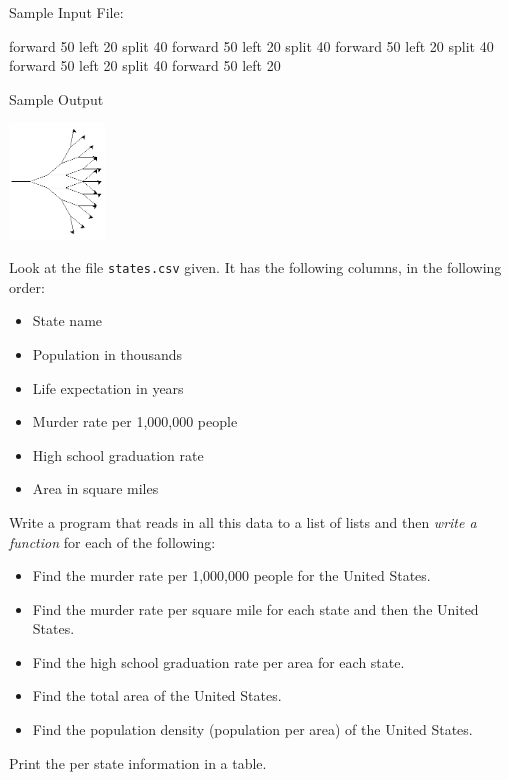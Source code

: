 \documentclass[11pt]{cselabheader}
\begin{document}
\begin{ex}[navigate3.py]
    Sample Input File:
    \begin{python3code}
forward 50
left 20
split 40
forward 50
left 20
split 40
forward 50
left 20
split 40
forward 50
left 20
split 40
forward 50
left 20
    \end{python3code}

    Sample Output
    \begin{center}
      \includegraphics[width=1.0in]{img/nav3_example}
    \end{center}
  \end{ex}

  \begin{ex}[states.py]
    Look at the file \texttt{states.csv} given. It has the following columns, in
    the following order:
    \begin{itemize}
      \item State name
      \item Population in thousands
      \item Life expectation in years
      \item Murder rate per 1,000,000 people
      \item High school graduation rate
      \item Area in square miles
    \end{itemize}

    Write a program that reads in all this data to a list of lists and then
    \emph{write a function} for each of the following:
    \begin{itemize}
      \item Find the murder rate per 1,000,000 people for the United States.
      \item Find the murder rate per square mile for each state and then the
        United States.
      \item Find the high school graduation rate per area for each state.
      \item Find the total area of the United States.
      \item Find the population density (population per area) of the United
        States.
    \end{itemize}

    Print the per state information in a table.
  \end{ex}
\end{document}
